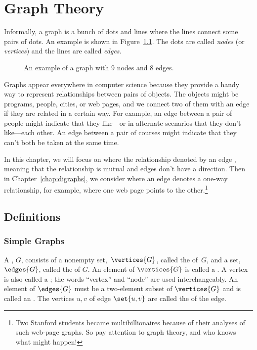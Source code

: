\chapter{Graph Theory}\label{chap:graph_theory}

Informally, a graph is a bunch of dots and lines where the lines
connect some pairs of dots.  An example is shown in
Figure~\ref{fig:graph-example}.  The dots are called \emph{nodes} (or
\emph{vertices}) and the lines are called \emph{edges}.

\begin{figure}[h]


\caption{An example of a graph with 9 nodes and 8 edges.}

\label{fig:graph-example}

\end{figure}

Graphs appear everywhere in computer science because they provide a handy
way to represent relationships between pairs of objects.  The objects
might be programs, people, cities, or web pages, and we connect two of
them with an edge if they are related in a certain way.  For example, an
edge between a pair of people might indicate that they like---or in
alternate scenarios that they don't like---each other.  An edge between a
pair of courses might indicate that they can't both be taken at the same
time.

In this chapter, we will focus on \emph{} where the
relationship denoted by an edge \emph{}, meaning that the
relationship is mutual and edges don't have a direction.  Then in
Chapter~\ref{chap:digraphs}, we consider \emph{}
where an edge denotes a one-way relationship, for example, where one web
page points to the other.\footnote{Two Stanford students became
  multibillionaires because of their analyses of such web-page graphs.  So
  pay attention to graph theory, and who knows what might happen!}

\section{Definitions}\label{degreessec}

\subsection{Simple Graphs}

\begin{definition}\label{graphdef}
  A , $G$, consists of a nonempty set,~$\vertices{G}$,
  called the  of~$G$, and a set, $\edges{G}$, called the
   of $G$.  An element of $\vertices{G}$ is called a
  .  A vertex is also called a ; the words
  ``vertex'' and ``node'' are used interchangeably.  An element of
  $\edges{G}$ must be a two-element subset of $\vertices{G}$ and is called
  an .  The vertices $u, v$ of edge $\set{u,v}$ are called the
   of the edge.
\end{definition}

